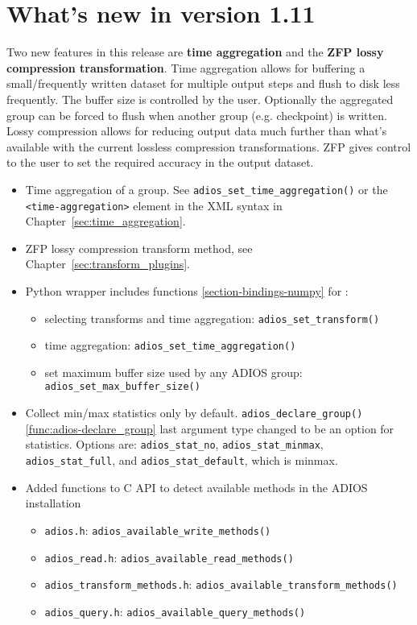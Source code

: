 \section {What's new in version 1.11}
Two new features in this release are {\bf time aggregation} and the {\bf ZFP lossy compression transformation}. Time aggregation allows for buffering a small/frequently written dataset for multiple output steps and flush to disk less frequently. The buffer size is controlled by the user. Optionally the aggregated group can be forced to flush when another group (e.g. checkpoint) is written. 
Lossy compression allows for reducing output data much further than what's available with the current lossless compression transformations. ZFP gives control to the user to set the required accuracy in the output dataset.  

\begin{itemize}
\item Time aggregation of a group. See \verb+adios_set_time_aggregation()+ or the \verb+<time-aggregation>+ element in the XML syntax in Chapter~\ref{sec:time_aggregation}.
\item ZFP lossy compression transform method, see Chapter~\ref{sec:transform_plugins}.
\item Python wrapper includes functions \ref{section-bindings-numpy} for :
	\begin{itemize}
	\item selecting transforms and time aggregation: \verb+adios_set_transform()+
	\item time aggregation: \verb+adios_set_time_aggregation()+
	\item set maximum buffer size used by any ADIOS group: \verb+adios_set_max_buffer_size()+
	\end{itemize}

\item Collect min/max statistics only by default.  \verb+adios_declare_group()+ \ref{func:adios-declare_group} last argument type changed to be an option for statistics. Options are: \verb+adios_stat_no+, \verb+adios_stat_minmax+, \verb+adios_stat_full+, and \verb+adios_stat_default+, which is minmax.
	
\item Added functions to C API to detect available methods in the ADIOS installation
      \begin{itemize}
      \item \verb+adios.h+: \verb+adios_available_write_methods()+
      \item \verb+adios_read.h+: \verb+adios_available_read_methods()+
      \item \verb+adios_transform_methods.h+: \verb+adios_available_transform_methods()+
      \item \verb+adios_query.h+: \verb+adios_available_query_methods()+
      \end{itemize}
      

\end{itemize}

